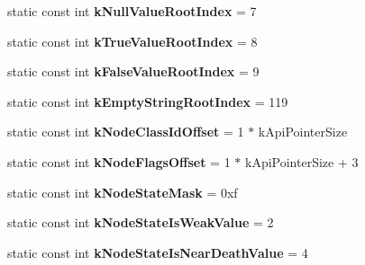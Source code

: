 \begin{DoxyCompactItemize}
\item 
\hypertarget{classv8_1_1internal_1_1_internals_ab311cf753ec5c968052bd83ef21e83f8}{}static const int {\bfseries k\+Null\+Value\+Root\+Index} = 7\label{classv8_1_1internal_1_1_internals_ab311cf753ec5c968052bd83ef21e83f8}

\item 
\hypertarget{classv8_1_1internal_1_1_internals_a93abd58b178eca469bade28e68b5c59e}{}static const int {\bfseries k\+True\+Value\+Root\+Index} = 8\label{classv8_1_1internal_1_1_internals_a93abd58b178eca469bade28e68b5c59e}

\item 
\hypertarget{classv8_1_1internal_1_1_internals_a90b6837aa368bbe4ffd914e6f753b167}{}static const int {\bfseries k\+False\+Value\+Root\+Index} = 9\label{classv8_1_1internal_1_1_internals_a90b6837aa368bbe4ffd914e6f753b167}

\item 
\hypertarget{classv8_1_1internal_1_1_internals_a6f669f3d98fe653b281b26be3bc0655a}{}static const int {\bfseries k\+Empty\+String\+Root\+Index} = 119\label{classv8_1_1internal_1_1_internals_a6f669f3d98fe653b281b26be3bc0655a}

\item 
\hypertarget{classv8_1_1internal_1_1_internals_af4fb6d499cb87f03031ad4d6be6bcd8f}{}static const int {\bfseries k\+Node\+Class\+Id\+Offset} = 1 $\ast$ k\+Api\+Pointer\+Size\label{classv8_1_1internal_1_1_internals_af4fb6d499cb87f03031ad4d6be6bcd8f}

\item 
\hypertarget{classv8_1_1internal_1_1_internals_aee5606f2a44d43d8dafe344e0bb753ef}{}static const int {\bfseries k\+Node\+Flags\+Offset} = 1 $\ast$ k\+Api\+Pointer\+Size + 3\label{classv8_1_1internal_1_1_internals_aee5606f2a44d43d8dafe344e0bb753ef}

\item 
\hypertarget{classv8_1_1internal_1_1_internals_a853acc088978d38a5a69091cf857a46d}{}static const int {\bfseries k\+Node\+State\+Mask} = 0xf\label{classv8_1_1internal_1_1_internals_a853acc088978d38a5a69091cf857a46d}

\item 
\hypertarget{classv8_1_1internal_1_1_internals_a8a5d4cc92a6952c2a50922c77a606e68}{}static const int {\bfseries k\+Node\+State\+Is\+Weak\+Value} = 2\label{classv8_1_1internal_1_1_internals_a8a5d4cc92a6952c2a50922c77a606e68}

\item 
\hypertarget{classv8_1_1internal_1_1_internals_a18f3e757639b07bdabb8cda7dd4a8bdb}{}static const int {\bfseries k\+Node\+State\+Is\+Near\+Death\+Value} = 4\label{classv8_1_1internal_1_1_internals_a18f3e757639b07bdabb8cda7dd4a8bdb}


\end{DoxyCompactItemize}
